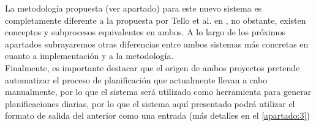 La metodología propuesta (ver apartado) para este nuevo sistema es completamente diferente a la propuesta por Tello et al. en \cite{articulo1}, no obstante, existen conceptos y subprocesos equivalentes en ambos. 
A lo largo de los próximos apartados subrayaremos otras diferencias entre ambos sistemas más concretas en cuanto a implementación y a la metodología.
\\

Finalmente, es importante destacar que el origen de ambos proyectos pretende automatizar el proceso de planificación que actualmente llevan a cabo manualmente, por lo que el sistema \legacy{} será utilizado como herramienta para generar planificaciones diarias, por lo que el sistema aquí presentado podrá utilizar el formato de salida del anterior como una entrada (más detalles en el \autoref{apartado:3}) 



